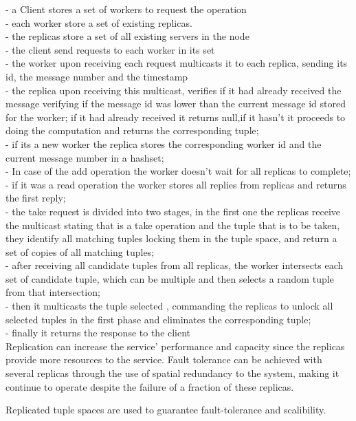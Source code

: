 \documentclass[times, 10pt,two column]{article}
\begin{document}
 - a Client stores a set of workers to request the operation\\
 - each worker store a set of existing replicas.\\
 - the replicas store a set of all existing servers in the node\\
 - the client send requests to each worker in its set\\
 - the worker upon receiving each request multicasts it to each replica, sending its id, the message number and the timestamp\\
 - the replica upon receiving this multicast, verifies if it had already received the message verifying if the message id was lower than the current message id stored for the worker; if it had already received it returns null,if it hasn't it proceeds to doing the computation and returns the corresponding tuple;\\
 - if its a new worker the replica stores the corresponding worker id and the current message number in a hashset;\\
 - In case of the add operation the worker doesn't wait for all replicas to complete;\\
 - if it was a read operation the worker stores all replies from replicas and returns the first reply;\\
 - the take request is divided into two stages, in the first one the replicas receive the multicast stating that is a take operation and the tuple that is to be taken, they identify all matching tuples locking them in the tuple space, and return a set of copies of all matching tuples;\\
 - after receiving all candidate tuples from all replicas, the worker intersects each set of candidate tuple, which can be multiple and then selects a random tuple from that intersection;\\
 - then it multicasts the tuple selected , commanding the replicas to unlock all selected tuples in the first phase and eliminates the corresponding tuple;\\
 - finally it returns the response to the client\\
 
Replication can increase the service’ performance and capacity since the replicas provide more resources to the service. 
Fault tolerance can be achieved with several replicas through the use of spatial redundancy to the system, making it continue to operate despite the failure of a fraction of these replicas.

Replicated tuple spaces are used to guarantee fault-tolerance and scalibility.
\end{document}
